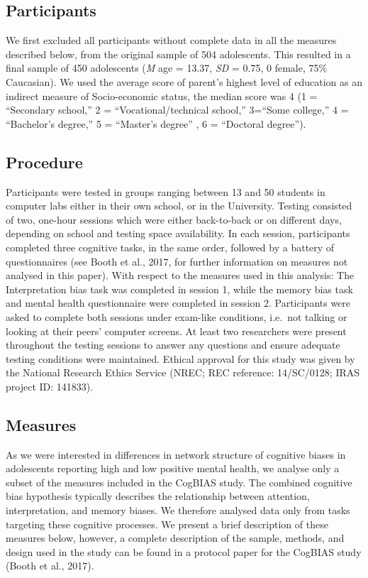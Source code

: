 \documentclass[
  english,
  man]{apa6}
\begin{document}
\hypertarget{participants}{%
\subsection{Participants}\label{participants}}

We first excluded all participants without complete data in all the measures described below, from the original sample of 504 adolescents. This resulted in a final sample of 450 adolescents (\emph{M} age = 13.37, \emph{SD} = 0.75, 0 female, 75\% Caucasian). We used the average score of parent's highest level of education as an indirect measure of Socio-economic status, the median score was 4 (1 = ``Secondary school,'' 2 = ``Vocational/technical school,'' 3=``Some college,'' 4 = ``Bachelor's degree,'' 5 = ``Master's degree'' , 6 = ``Doctoral degree'').

\hypertarget{procedure}{%
\subsection{Procedure}\label{procedure}}

Participants were tested in groups ranging between 13 and 50 students in computer labs either in their own school, or in the University. Testing consisted of two, one-hour sessions which were either back-to-back or on different days, depending on school and testing space availability. In each session, participants completed three cognitive tasks, in the same order, followed by a battery of questionnaires (see Booth et al., 2017, for further information on measures not analysed in this paper). With respect to the measures used in this analysis: The Interpretation bias task was completed in session 1, while the memory bias task and mental health questionnaire were completed in session 2. Participants were asked to complete both sessions under exam-like conditions, i.e.~not talking or looking at their peers' computer screens. At least two researchers were present throughout the testing sessions to answer any questions and ensure adequate testing conditions were maintained. Ethical approval for this study was given by the National Research Ethics Service (NREC; REC reference: 14/SC/0128; IRAS project ID: 141833).

\hypertarget{measures}{%
\subsection{Measures}\label{measures}}

As we were interested in differences in network structure of cognitive biases in adolescents reporting high and low positive mental health, we analyse only a subset of the measures included in the CogBIAS study. The combined cognitive bias hypothesis typically describes the relationship between attention, interpretation, and memory biases. We therefore analysed data only from tasks targeting these cognitive processes. We present a brief description of these measures below, however, a complete description of the sample, methods, and design used in the study can be found in a protocol paper for the CogBIAS study (Booth et al., 2017).
\end{document}
